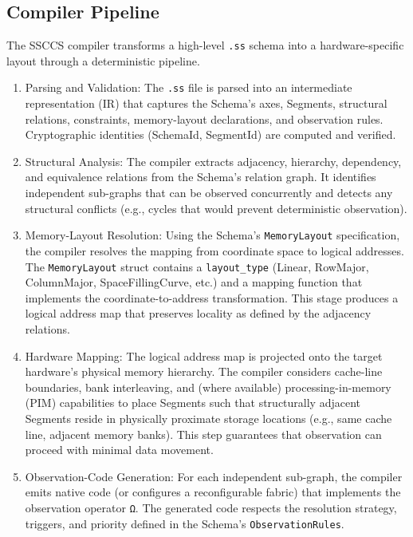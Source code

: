 \documentclass[
  a4paper,
  DIV=11,
  numbers=noendperiod]{scrartcl}
\begin{document}
\subsection{Compiler Pipeline}\label{compiler-pipeline}

The SSCCS compiler transforms a high-level \texttt{.ss} schema into a
hardware-specific layout through a deterministic pipeline.

\begin{enumerate}
\def\labelenumi{\arabic{enumi}.}
\item
  Parsing and Validation: The \texttt{.ss} file is parsed into an
  intermediate representation (IR) that captures the Schema's axes,
  Segments, structural relations, constraints, memory-layout
  declarations, and observation rules. Cryptographic identities
  (SchemaId, SegmentId) are computed and verified.
\item
  Structural Analysis: The compiler extracts adjacency, hierarchy,
  dependency, and equivalence relations from the Schema's relation
  graph. It identifies independent sub-graphs that can be observed
  concurrently and detects any structural conflicts (e.g., cycles that
  would prevent deterministic observation).
\item
  Memory-Layout Resolution: Using the Schema's \texttt{MemoryLayout}
  specification, the compiler resolves the mapping from coordinate space
  to logical addresses. The \texttt{MemoryLayout} struct contains a
  \texttt{layout\_type} (Linear, RowMajor, ColumnMajor,
  SpaceFillingCurve, etc.) and a mapping function that implements the
  coordinate-to-address transformation. This stage produces a logical
  address map that preserves locality as defined by the adjacency
  relations.
\item
  Hardware Mapping: The logical address map is projected onto the target
  hardware's physical memory hierarchy. The compiler considers
  cache-line boundaries, bank interleaving, and (where available)
  processing-in-memory (PIM) capabilities to place Segments such that
  structurally adjacent Segments reside in physically proximate storage
  locations (e.g., same cache line, adjacent memory banks). This step
  guarantees that observation can proceed with minimal data movement.
\item
  Observation-Code Generation: For each independent sub-graph, the
  compiler emits native code (or configures a reconfigurable fabric)
  that implements the observation operator \texttt{Ω}. The generated
  code respects the resolution strategy, triggers, and priority defined
  in the Schema's \texttt{ObservationRules}.
\end{enumerate}
\end{document}
